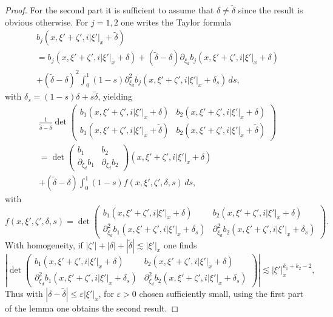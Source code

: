 \documentclass[JEP,XML,SOM,Unicode,published]{cedram}
\theoremstyle{plain}
\theoremstyle{definition}
\newcommand{\suff}{sufficiently\xspace}
\let\eps\varepsilon
\begin{document}
\begin{proof}
For the second part it is sufficient to assume that
$\delta \neq \tilde{\delta}$ since the result is obvious otherwise.
For $j=1,2$ one writes the Taylor formula
\begin{multline*}
b_j (x,\xi' + \zeta', i |\xi'|_x+ \tilde{\delta})\\
= b_j (x,\xi' + \zeta', i |\xi'|_x+ \delta)
+ (\tilde{\delta} - \delta)
\partial_{\xi_d} b_j (x,\xi' + \zeta', i |\xi'|_x+ \delta)\\
+ (\tilde{\delta} - \delta)^2
\int_0^1 (1- s) \partial_{\xi_d}^2 b_j
(x,\xi' + \zeta', i |\xi'|_x+ \delta_s)
\, ds,
\end{multline*}
with $\delta_s = (1-s)\delta +s \tilde{\delta}$,
yielding
\begin{multline*}
\frac{1}{\tilde{\delta} - \delta}
\det \begin{pmatrix}
b_1 (x,\xi' + \zeta', i |\xi'|_x+ \delta)
&b_2 (x,\xi' + \zeta', i |\xi'|_x+ \delta)\\[
4pt]
b_1 (x,\xi' + \zeta', i |\xi'|_x+ \tilde{\delta})
& b_2 (x,\xi' + \zeta', i |\xi'|_x+ \tilde{\delta})
\end{pmatrix}\\
= \det \begin{pmatrix}
b_1 &b_2 \\[2pt]
\partial_{\xi_d} b_1 &\partial_{\xi_d} b_2
\end{pmatrix}(x,\xi' + \zeta', i |\xi'|_x+ \delta)\\[-5pt]
+
(\tilde{\delta} - \delta) \int_0^1 (1-s)
f(x,\xi', \zeta', \delta, s)\,
d s,
\end{multline*}
with
\begin{equation*}
f(x,\xi', \zeta', \delta, s)= \det \begin{pmatrix}
b_1 (x,\xi' + \zeta', i |\xi'|_x+ \delta)
&b_2 (x,\xi' + \zeta', i |\xi'|_x+ \delta)\\[2pt]
\partial_{\xi_d}^2 b_1 (x,\xi' + \zeta', i |\xi'|_x+\delta_s)
&\partial_{\xi_d}^2 b_2 (x,\xi' + \zeta', i |\xi'|_x+\delta_s)
\end{pmatrix}.
\end{equation*}
With homogeneity, if $|\zeta'| + |\delta| + |\tilde{\delta}| \lesssim |\xi'|_x$ one
finds
\[
\left| \det \begin{pmatrix}
b_1 (x,\xi' + \zeta', i |\xi'|_x+ \delta)
&b_2 (x,\xi' + \zeta', i |\xi'|_x+ \delta)\\[
2pt]
\partial_{\xi_d}^2 b_1 (x,\xi' + \zeta', i |\xi'|_x+\delta_s)
&\partial_{\xi_d}^2 b_2 (x,\xi' + \zeta', i |\xi'|_x+\delta_s)
\end{pmatrix}\right|
\lesssim |\xi'|_x^{k_1 + k_2 -2},
\]
Thus with $|\delta - \tilde{\delta}|\leq \eps |\xi'|_x$, for
$\eps>0$ chosen \suff small, using the first part of the lemma one obtains
the second result.
\end{proof}
\end{document}
